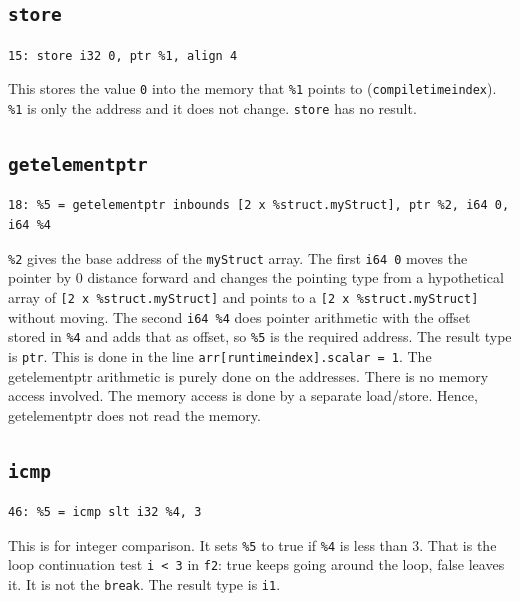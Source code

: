 \documentclass[11pt,a4paper]{article}
\begin{document}
\subsection*{\texttt{store}}

\begin{lstlisting}
15: store i32 0, ptr %1, align 4
\end{lstlisting}

This stores the value \texttt{0} into the memory that \texttt{\%1} points to
(\texttt{compiletimeindex}). \texttt{\%1} is only the address and it does not
change. \texttt{store} has no result.

\subsection*{\texttt{getelementptr}}

\begin{lstlisting}
18: %5 = getelementptr inbounds [2 x %struct.myStruct], ptr %2, i64 0, i64 %4
\end{lstlisting}

\texttt{\%2} gives the base address of the \texttt{myStruct} array. The first
\texttt{i64 0} moves the pointer by 0 distance forward and changes the pointing
type from a hypothetical array of \texttt{[2 x \%struct.myStruct]} and points to a
\texttt{[2 x \%struct.myStruct]} without moving. The second \texttt{i64 \%4} does pointer
arithmetic with the offset stored in \texttt{\%4} and adds that as offset, so
\texttt{\%5} is the required address. The result type is \texttt{ptr}. This is done in
the line \texttt{arr[runtimeindex].scalar = 1}.
The getelementptr arithmetic is purely done on the addresses. There is no memory access involved. The memory access is done by a separate load/store. Hence, getelementptr does not read the memory.

\subsection*{\texttt{icmp}}

\begin{lstlisting}
46: %5 = icmp slt i32 %4, 3
\end{lstlisting}

This is for integer comparison. It sets \texttt{\%5} to true if \texttt{\%4}
is less than 3. That is the loop continuation test \texttt{i < 3} in
\texttt{f2}: true keeps going around the loop, false leaves it. It is
not the \texttt{break}. The result type is \texttt{i1}.
\end{document}
